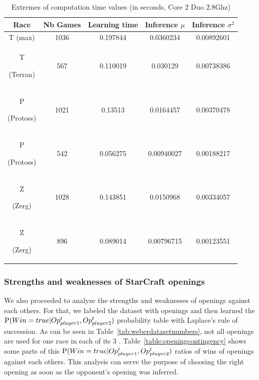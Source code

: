 \begin{table}[h]
\caption{Extremes of computation time values (in seconds, Core 2 Duo 2.8Ghz)}
\begin{center}
\begin{tabular}{|c|cc|cc|}
\hline
Race
& Nb Games
& Learning time
& Inference $\mu$
& Inference $\sigma^2$ \\ \hline
T (max) & 1036 & 0.197844 & 0.0360234 & 0.00892601 \\
T \begin{tiny}(Terran)\end{tiny} & 567 & 0.110019 & 0.030129 & 0.00738386 \\ 
P \begin{tiny}(Protoss)\end{tiny} & 1021 & 0.13513 & 0.0164457 & 0.00370478 \\
P \begin{tiny}(Protoss)\end{tiny} & 542 & 0.056275 & 0.00940027 & 0.00188217 \\ 
Z \begin{tiny}(Zerg)\end{tiny} & 1028 & 0.143851 & 0.0150968 & 0.00334057 \\
Z \begin{tiny}(Zerg)\end{tiny} & 896 & 0.089014 & 0.00796715 & 0.00123551 \\ \hline
\end{tabular}
\label{CPU}
\end{center}
\end{table}

\subsubsection{Strengths and weaknesses of StarCraft openings}
\label{sec:openingsstrengthsweaknesses}

We also proceeded to analyze the strengths and weaknesses of openings against each others. For that, we labeled the dataset with openings and then learned the $\mathrm{P}(Win=true|Op_{player1}^t,Op_{player2}^t)$ probability table with Laplace's rule of succession. As can be seen in Table~\ref{tab:weberdatasetnumbers}, not all openings are used for one race in each of its 3 . Table~\ref{table:openingcontingency} shows some parts of this $\mathrm{P}(Win=true|Op_{player1}^t,Op_{player2}^t)$ ratios of wins of openings against each others. This analysis can serve the purpose of choosing the right opening as soon as the opponent's opening was inferred.

